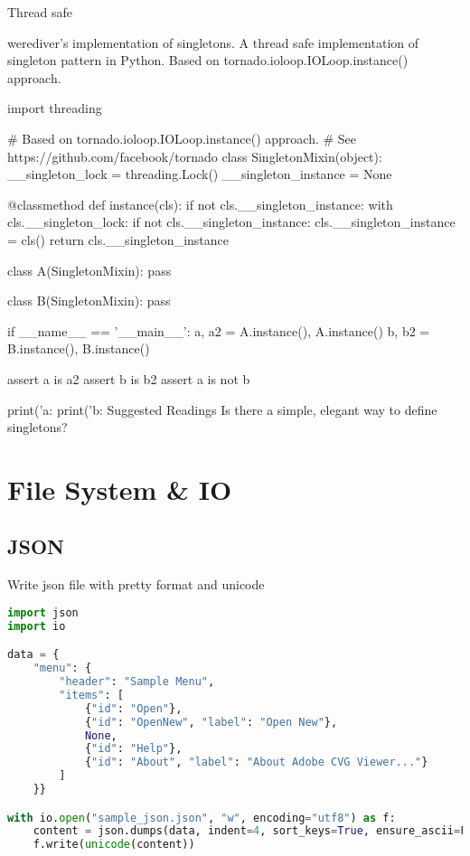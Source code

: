 Thread safe

werediver's implementation of singletons. A thread safe implementation of singleton pattern in Python. Based on tornado.ioloop.IOLoop.instance() approach.

import threading

# Based on tornado.ioloop.IOLoop.instance() approach.
# See https://github.com/facebook/tornado
class SingletonMixin(object):
    __singleton_lock = threading.Lock()
    __singleton_instance = None

    @classmethod
    def instance(cls):
        if not cls.__singleton_instance:
            with cls.__singleton_lock:
                if not cls.__singleton_instance:
                    cls.__singleton_instance = cls()
        return cls.__singleton_instance

class A(SingletonMixin):
    pass

class B(SingletonMixin):
    pass

if __name__ == '__main__':
    a, a2 = A.instance(), A.instance()
    b, b2 = B.instance(), B.instance()

    assert a is a2
    assert b is b2
    assert a is not b

    print('a:  %
    print('b:  %
Suggested Readings
Is there a simple, elegant way to define singletons?

\section{File System \& IO}

\subsection{JSON}

Write json file with pretty format and unicode

\begin{lstlisting}[language=Python]
import json
import io

data = {
    "menu": {
        "header": "Sample Menu",
        "items": [
            {"id": "Open"},
            {"id": "OpenNew", "label": "Open New"},
            None,
            {"id": "Help"},
            {"id": "About", "label": "About Adobe CVG Viewer..."}
        ]
    }}

with io.open("sample_json.json", "w", encoding="utf8") as f:
    content = json.dumps(data, indent=4, sort_keys=True, ensure_ascii=False)
    f.write(unicode(content))
\end{lstlisting}

